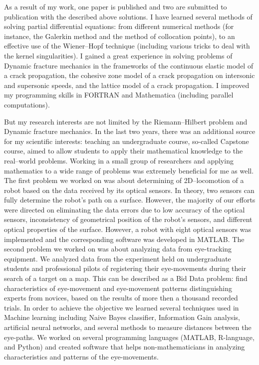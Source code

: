 \documentclass[11pt]{amsart}
\begin{document}
As a result of my work, one paper is published and two are submitted to publication with the described above solutions. I have learned several methods of solving partial differential equations: from different numerical methods (for instance, the Galerkin method and the method of collocation points), to an effective use of the Wiener--Hopf technique (including various tricks to deal with the kernel singularities). I gained a great experience in solving problems of Dynamic fracture mechanics in the frameworks of the continuous elastic model of a crack propagation, the cohesive zone model of a crack propagation on intersonic and supersonic speeds, and the lattice model of a crack propagation. I improved my programming skills in FORTRAN and Mathematica (including parallel computations).

But my research interests are not limited by the Riemann--Hilbert problem and Dynamic fracture mechanics. In the last two years, there was an additional source for my scientific interests: teaching an undergraduate course, so-called Capstone course, aimed to allow students to apply their mathematical knowledge to the real--world problems. Working in a small group of researchers and applying mathematics to a wide range of problems was extremely beneficial for me as well. The first problem we worked on was about determining of 2D--locomotion of a robot based on the data received by its optical sensors. In theory, two sensors can fully determine the robot's path on a surface. However, the majority of our efforts were directed on eliminating the data errors due to low accuracy of the optical sensors, inconsistency of geometrical position of the robot's sensors, and different optical properties of the surface. However, a robot with eight optical sensors was implemented and the corresponding software was developed in MATLAB. The second problem we worked on was about analyzing data from eye-tracking equipment. We analyzed data from the experiment held on undergraduate students and professional pilots of registering their eye-movements during their search of a target on a map. This can be described as a Bid Data problem: find characteristics of eye-movement and eye-movement patterns distinguishing experts from novices, based on the results of more then a thousand recorded trials. In order to achieve the objective we learned several techniques used in Machine learning including Naive Bayes classifier, Information Gain analysis, artificial neural networks, and several methods to measure distances between the eye-paths. We worked on several programming languages (MATLAB, R-language, and Python) and created software that helps non-mathematicians in analyzing characteristics and patterns of the eye-movements.
\end{document}
